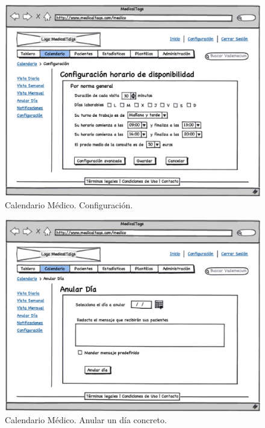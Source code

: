 \documentclass[a4paper,oneside,11pt]{book}
\begin{document}
			
			\begin{figure}[H]
			  \centering
			    \includegraphics[width=12cm]{img/eps/15_Calendario_Medico_Configuracion.eps}
			  \caption{Calendario Médico. Configuración.}
			  \label{fig:calendario_configuracion}
			\end{figure}
			
			\begin{figure}[H]
			  \centering
			    \includegraphics[width=12cm]{img/eps/14_Calendario_Medico_Anular.eps}
			  \caption{Calendario Médico. Anular un día concreto.}
			  \label{fig:calendario_anular_dia}
			\end{figure}
			
\end{document}
